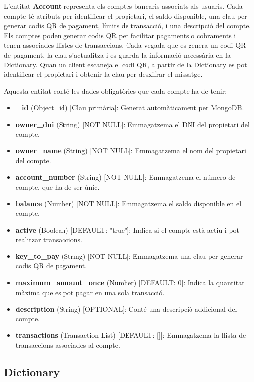 \documentclass[a4paper,12pt,twoside]{ThesisStyle}
\begin{document}
L'entitat \textbf{Account} representa els comptes bancaris associats als usuaris. Cada compte té atributs per identificar el propietari, el saldo disponible, una clau per generar codis QR de pagament, límits de transacció, i una descripció del compte. Els comptes poden generar codis QR per facilitar pagaments o cobraments i tenen associades llistes de transaccions. Cada vegada que es genera un codi QR de pagament, la clau s'actualitza i es guarda la informació necessària en la Dictionary. Quan un client escaneja el codi QR, a partir de la Dictionary es pot identificar el propietari i obtenir la clau per desxifrar el missatge.

Aquesta entitat conté les dades obligatòries que cada compte ha de tenir:

\begin{itemize}
    \item \textbf{\_id} (Object\_id) [Clau primària]: Generat automàticament per MongoDB.
    \item \textbf{owner\_dni} (String) [NOT NULL]: Emmagatzema el DNI del propietari del compte.
    \item \textbf{owner\_name} (String) [NOT NULL]: Emmagatzema el nom del propietari del compte.
    \item \textbf{account\_number} (String) [NOT NULL]: Emmagatzema el número de compte, que ha de ser únic.
    \item \textbf{balance} (Number) [NOT NULL]: Emmagatzema el saldo disponible en el compte.
    \item \textbf{active} (Boolean) [DEFAULT: "true"]: Indica si el compte està actiu i pot realitzar transaccions.
    \item \textbf{key\_to\_pay} (String) [NOT NULL]: Emmagatzema una clau per generar codis QR de pagament.
    \item \textbf{maximum\_amount\_once} (Number) [DEFAULT: 0]: Indica la quantitat màxima que es pot pagar en una sola transacció.
    \item \textbf{description} (String) [OPTIONAL]: Conté una descripció addicional del compte.
    \item \textbf{transactions} (Transaction List) [DEFAULT: []]: Emmagatzema la llista de transaccions associades al compte.
\end{itemize}




\subsection{Dictionary}
\label{subsec: Dictionary}
\end{document}
